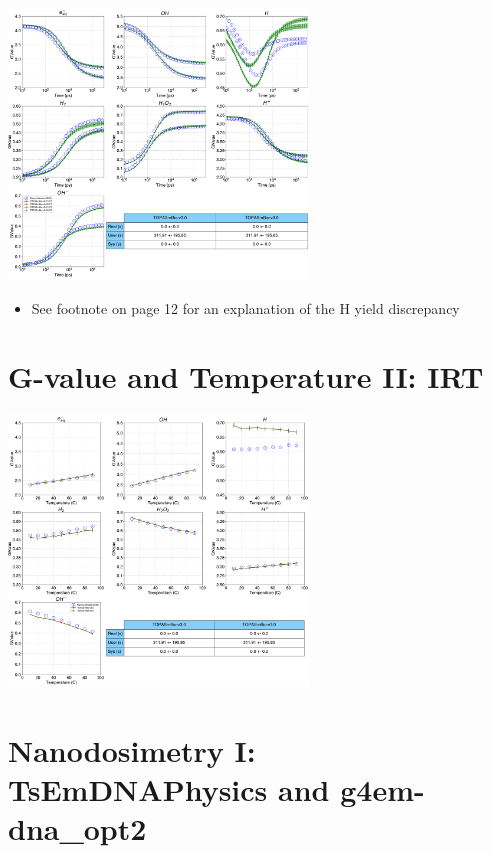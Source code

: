 \documentclass[aspectratio=1610]{beamer}
\begin{document}
\begin{frame}{\secname}
 \centering
  \includegraphics[width=0.6\textwidth]{./GvalueIRT-Temperature/TimeEvolution}
\begin{itemize}
\item \tiny{See footnote on page 12 for an explanation of the H yield discrepancy}
\end{itemize}
\end{frame}

\section{G-value and Temperature II: IRT}

\begin{frame}{\secname}
 \centering
  \includegraphics[width=0.6\textwidth]{./GvalueIRT-Temperature/TemperatureEvolution}
\end{frame}

\section{Nanodosimetry I: TsEmDNAPhysics and g4em-dna\_opt2}
\end{document}
